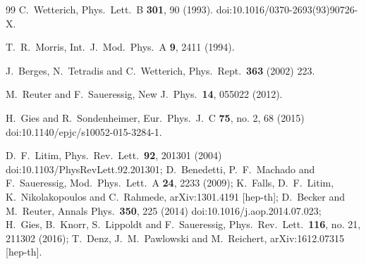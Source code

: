 \documentclass[%
 reprint,
 superscriptaddress,
preprintnumbers,
nofootinbib,
 amsmath,amssymb,
 aps,
prl,
]{revtex4-1}
\begin{document}
\begin{thebibliography}{99}
  C.~Wetterich,
  Phys.\ Lett.\ B {\bf 301}, 90 (1993).
  doi:10.1016/0370-2693(93)90726-X.
  
  T.~R.~Morris,
  Int.\ J.\ Mod.\ Phys.\ A {\bf 9}, 2411 (1994).
  
  J.~Berges, N.~Tetradis and C.~Wetterich,
  Phys.\ Rept.\  {\bf 363} (2002) 223.
  
  M.~Reuter and F.~Saueressig,
  New J.\ Phys.\  {\bf 14}, 055022 (2012).
  
  H.~Gies and R.~Sondenheimer,
  Eur.\ Phys.\ J.\ C {\bf 75}, no. 2, 68 (2015)
  doi:10.1140/epjc/s10052-015-3284-1.
  
  D.~F.~Litim,
  Phys.\ Rev.\ Lett.\  {\bf 92}, 201301 (2004)
  doi:10.1103/PhysRevLett.92.201301;
%
  D.~Benedetti, P.~F.~Machado and F.~Saueressig,
  Mod.\ Phys.\ Lett.\ A {\bf 24}, 2233 (2009);
  K.~Falls, D.~F.~Litim, K.~Nikolakopoulos and C.~Rahmede,
  arXiv:1301.4191 [hep-th];
  D.~Becker and M.~Reuter,
  Annals Phys.\  {\bf 350}, 225 (2014)
  doi:10.1016/j.aop.2014.07.023;
  H.~Gies, B.~Knorr, S.~Lippoldt and F.~Saueressig,
  Phys.\ Rev.\ Lett.\  {\bf 116}, no. 21, 211302 (2016);
  T.~Denz, J.~M.~Pawlowski and M.~Reichert,
  arXiv:1612.07315 [hep-th].
  

\end{thebibliography}
\end{document}
